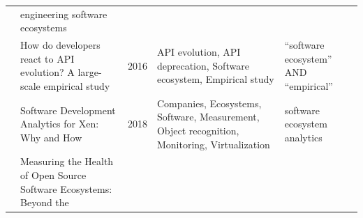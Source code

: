 \documentclass[]{book}
\begin{document}
\begin{longtable}[]{@{}lllll@{}}
\begin{minipage}[t]{0.34\columnwidth}
\strut
\end{minipage} & \begin{minipage}[t]{0.13\columnwidth}\raggedright\strut
engineering software ecosystems\strut
\end{minipage}\tabularnewline
\begin{minipage}[t]{0.05\columnwidth}\raggedright\strut
\citet{Hora2016}\strut
\end{minipage} & \begin{minipage}[t]{0.31\columnwidth}\raggedright\strut
How do developers react to API evolution? A large-scale empirical
study\strut
\end{minipage} & \begin{minipage}[t]{0.02\columnwidth}\raggedright\strut
2016\strut
\end{minipage} & \begin{minipage}[t]{0.34\columnwidth}\raggedright\strut
API evolution, API deprecation, Software ecosystem, Empirical
study\strut
\end{minipage} & \begin{minipage}[t]{0.13\columnwidth}\raggedright\strut
``software ecosystem'' AND ``empirical''\strut
\end{minipage}\tabularnewline
\begin{minipage}[t]{0.05\columnwidth}\raggedright\strut
\citet{Izquierdo2018}\strut
\end{minipage} & \begin{minipage}[t]{0.31\columnwidth}\raggedright\strut
Software Development Analytics for Xen: Why and How\strut
\end{minipage} & \begin{minipage}[t]{0.02\columnwidth}\raggedright\strut
2018\strut
\end{minipage} & \begin{minipage}[t]{0.34\columnwidth}\raggedright\strut
Companies, Ecosystems, Software, Measurement, Object recognition,
Monitoring, Virtualization\strut
\end{minipage} & \begin{minipage}[t]{0.13\columnwidth}\raggedright\strut
software ecosystem analytics\strut
\end{minipage}\tabularnewline
\begin{minipage}[t]{0.05\columnwidth}\raggedright\strut
\citet{Jansen2014}\strut
\end{minipage} & \begin{minipage}[t]{0.31\columnwidth}\raggedright\strut
Measuring the Health of Open Source Software Ecosystems: Beyond the

\end{minipage}
\end{longtable}
\end{document}
